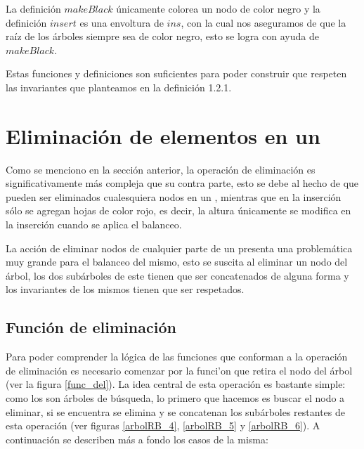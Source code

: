 La definici\'on $makeBlack$ únicamente colorea un nodo de color negro y la definición
$insert$ es una envoltura de $ins$, con la cual nos aseguramos de que la ra\'iz de los \'arboles
siempre sea de color negro, esto se logra con ayuda de $makeBlack$.

Estas funciones y definiciones son suficientes para poder construir {\arns} que respeten las
invariantes que planteamos en la definici\'on 1.2.1.

\section{Eliminación de elementos en un {\arn}}

Como se menciono en la secci\'on anterior, la operaci\'on de eliminaci\'on es significativamente m\'as
compleja que su contra parte, esto se debe al hecho de que pueden ser eliminados cualesquiera nodos
 en un {\arn}, mientras que en la inserci\'on s\'olo se agregan hojas de color rojo, es decir,
la altura \'unicamente se modifica en la inserción cuando se aplica el balanceo.

La acci\'on de eliminar nodos de cualquier parte de un {\arn} presenta una problemática muy grande para
el balanceo del mismo, esto se suscita al eliminar un nodo del \'arbol, los dos subárboles de este
tienen que ser concatenados de alguna forma y los invariantes de los mismos tienen que ser
respetados.

\subsection{Funci\'on de eliminaci\'on}

Para poder comprender la l\'ogica de las funciones que conforman a la operaci\'on de eliminaci\'on
es necesario comenzar por la funci'on que retira el nodo del \'arbol (ver la figura \ref{func_del}).
La idea central de esta operaci\'on es bastante simple: como los {\arns} son \'arboles de búsqueda,
lo primero que hacemos es buscar el nodo a eliminar, si se encuentra se elimina y se concatenan los
subárboles restantes de esta operaci\'on (ver figuras \ref{arbolRB_4}, \ref{arbolRB_5} y
\ref{arbolRB_6}). A continuaci\'on se describen m\'as a fondo los casos de la misma:

